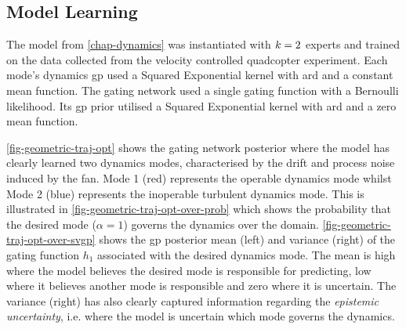 \documentclass{mimosis-class/mimosis}
\numberwithin{equation}{chapter}
\newcommand{\modeInd}{\ensuremath{k}}
\newcommand{\ModeInd}{\ensuremath{\MakeUppercase{\modeInd}}}
\newcommand{\modeVar}{\ensuremath{\alpha}}
\newcommand{\gatingFunc}{\ensuremath{h}}
\begin{document}
{\subsection{Model Learning}
\label{sec:org0d75d8e}
The model from \cref{chap-dynamics} was instantiated with \(\ModeInd=2\) experts and trained on
the data collected from the velocity controlled quadcopter experiment.
Each mode's dynamics \acrshort{gp} used a Squared Exponential kernel with \acrfull{ard} and a constant mean function.
The gating network used a single gating function with a Bernoulli likelihood.
Its \acrshort{gp} prior utilised a Squared Exponential kernel with \acrshort{ard} and a zero mean function.

\cref{fig-geometric-traj-opt} shows the gating network posterior where the model has clearly learned
two dynamics modes, characterised by the drift and process noise induced by the fan.
Mode 1 (red) represents the operable dynamics mode whilst Mode 2 (blue)
represents the inoperable turbulent dynamics mode.
This is illustrated in \cref{fig-geometric-traj-opt-over-prob} which shows the probability that
the desired mode (\(\modeVar = 1\)) governs the dynamics over the domain.
\cref{fig-geometric-traj-opt-over-svgp} shows the \acrshort{gp} posterior mean (left) and variance (right) of the
gating function \(\gatingFunc_1\) associated with the desired dynamics mode.
The mean is high where the model believes the desired mode is responsible for predicting, low where it
believes another mode is responsible and zero where it is uncertain.
The variance (right) has also clearly captured information regarding the \emph{epistemic uncertainty},
i.e. where the model is uncertain which mode governs the dynamics.

}
\end{document}
